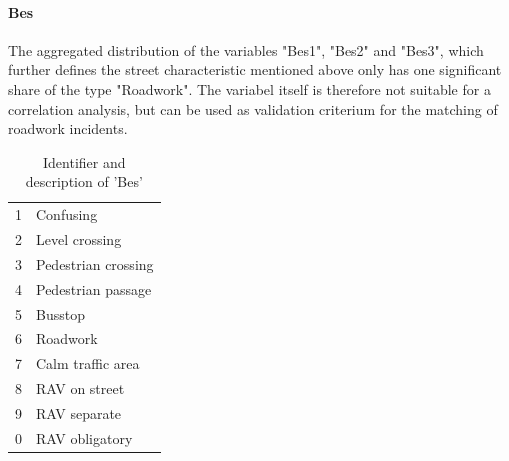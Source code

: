 \documentclass[a4paper,headsepline,footsepline,fontsize=11pt,BCOR=12mm,DIV=12]{report}
\begin{document}
\paragraph{Bes}
The aggregated distribution of the variables "Bes1", "Bes2" and "Bes3", which further defines the street characteristic mentioned above only has one significant share of the type "Roadwork". The variabel itself is therefore not suitable for a correlation analysis, but can be used as validation criterium for the matching of roadwork incidents.
\noindent
\begin{table}[h!]
	\centering
	\begin{tabular}{c|l}  
		1 & Confusing \\ 
		2 & Level crossing \\
		3 & Pedestrian crossing \\
		4 & Pedestrian passage \\
		5 & Busstop \\
		6 & Roadwork \\
		7 & Calm traffic area \\
		8 & RAV on street \\
		9 & RAV separate \\
		0 & RAV obligatory \\
	\end{tabular}
	\caption{Identifier and description of 'Bes'}
	\label{table:baysis_dataset_Bes}
\end{table}
\end{document}
